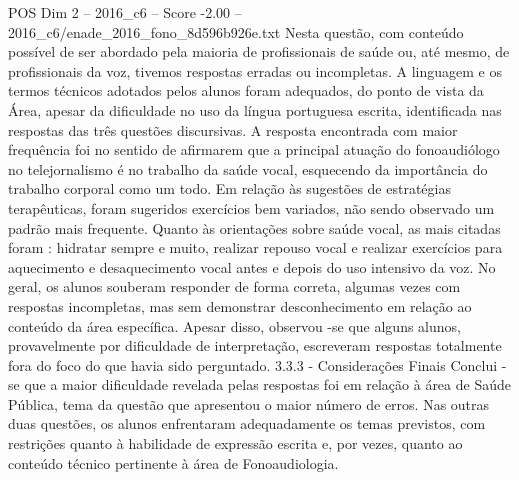 \begin{textsample}{POS Dim 2 – 2016\_c6 – Score -2.00 – 2016\_c6/enade\_2016\_fono\_8d596b926e.txt}
Nesta questão, com conteúdo possível de ser abordado pela maioria de profissionais de saúde ou, até mesmo, de profissionais da voz, tivemos respostas erradas ou incompletas.
A linguagem e os termos técnicos adotados pelos alunos foram adequados, do ponto de vista da Área, apesar da dificuldade no uso da língua portuguesa escrita, identificada nas respostas das três questões discursivas.
A resposta encontrada com maior frequência foi no sentido de afirmarem que a principal atuação do fonoaudiólogo no telejornalismo é no trabalho da saúde vocal, esquecendo da importância do trabalho corporal como um todo.
Em relação às sugestões de estratégias terapêuticas, foram sugeridos exercícios bem variados, não sendo observado um padrão mais frequente.
Quanto às orientações sobre saúde vocal, as mais citadas foram : hidratar sempre e muito, realizar repouso vocal e realizar exercícios para aquecimento e desaquecimento vocal antes e depois do uso intensivo da voz.
No geral, os alunos souberam responder de forma correta, algumas vezes com respostas incompletas, mas sem demonstrar desconhecimento em relação ao conteúdo da área específica.
Apesar disso, observou -se que alguns alunos, provavelmente por dificuldade de interpretação, escreveram respostas totalmente fora do foco do que havia sido perguntado. 3.3.3 - Considerações Finais Conclui -se que a maior dificuldade revelada pelas respostas foi em relação à área de Saúde Pública, tema da questão que apresentou o maior número de erros.
Nas outras duas questões, os alunos enfrentaram adequadamente os temas previstos, com restrições quanto à habilidade de expressão escrita e, por vezes, quanto ao conteúdo técnico pertinente à área de Fonoaudiologia.

\end{textsample}
